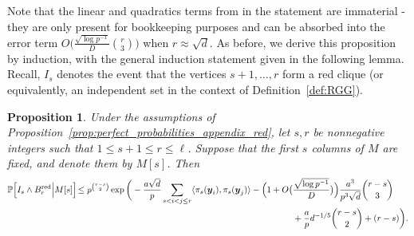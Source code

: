 \documentclass[11pt]{amsart}
\newtheorem{proposition}[theorem]{\bf Proposition}
\theoremstyle{definition}
\def\by{\boldsymbol{y}}
\DeclareMathOperator{\red}{red}
\begin{document}
Note that the linear and quadratics terms from in the statement are immaterial - they are only present for bookkeeping purposes and can be absorbed into the error term $O\big(\frac{\sqrt{\log p^{-1}}}{D}\binom{r}{3}\big)$ when $r\approx \sqrt{d}$. As before, we derive this proposition by induction, with the general induction statement given in the following lemma. Recall, $I_s$ denotes the event that the vertices $s+1, \dots, r$ form a red clique (or equivalently, an independent set in the context of Definition~\ref{def:RGG}). 

\begin{proposition}\label{prop:induction_appendix_red}
Under the assumptions of Proposition~\ref{prop:perfect_probabilities_appendix_red}, let $s, r$ be nonnegative integers such that $1\leq s+1\leq r\leq \ell$. Suppose that the first $s$ columns of $M$ are fixed, and denote them by $M[s]$. Then
{\smaller[0.3]
\begin{align}
    \mathbb{P}\Big[I_s\wedge B^{\red}_r\Big| M[s]\Big]\!\leq p^{\binom{r-s}{2}}\exp\bigg(-\frac{a\sqrt{d}}{p}\sum_{s<i< j\leq r}\langle \pi_s(\by_i), \pi_s(\by_j)\rangle -\Big(1+O\big(& \frac{\sqrt{\log p^{-1}}}{D}\big)\Big)\frac{a^3}{p^3\sqrt{d}}\binom{r-s}{3} \notag\\
    &+\frac{a}{p}d^{-1/5}\binom{r-s}{2} +(r-s)\bigg). \label{eq:induction_bound_red_2_appendix}
\end{align}
}
\end{proposition}
\end{document}
